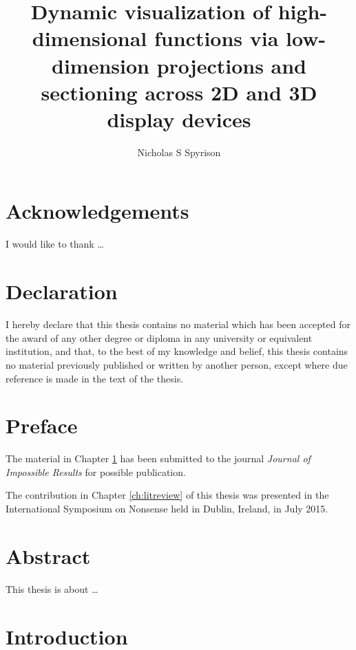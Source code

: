 \documentclass{monashthesis}
\author{Nicholas S Spyrison}
\title{Dynamic visualization of high-dimensional functions via low-dimension
projections and sectioning across 2D and 3D display devices}
\begin{document}

\titlepage

{\sf\tighttoc\doublespacing}

\chapter*{Acknowledgements}\label{acknowledgements}

I would like to thank \dots

\chapter*{Declaration}\label{declaration}

I hereby declare that this thesis contains no material which has been
accepted for the award of any other degree or diploma in any university
or equivalent institution, and that, to the best of my knowledge and
belief, this thesis contains no material previously published or written
by another person, except where due reference is made in the text of the
thesis.

\vspace*{2cm}\par\authorname

\chapter*{Preface}\label{preface}

The material in Chapter \ref{ch:intro} has been submitted to the journal
\emph{Journal of Impossible Results} for possible publication.

The contribution in Chapter \ref{ch:litreview} of this thesis was
presented in the International Symposium on Nonsense held in Dublin,
Ireland, in July 2015.

\chapter*{Abstract}\label{abstract}

This thesis is about \ldots{}

\clearpage{}\setcounter{page}{0}

\chapter{Introduction}\label{ch:intro}
\end{document}
